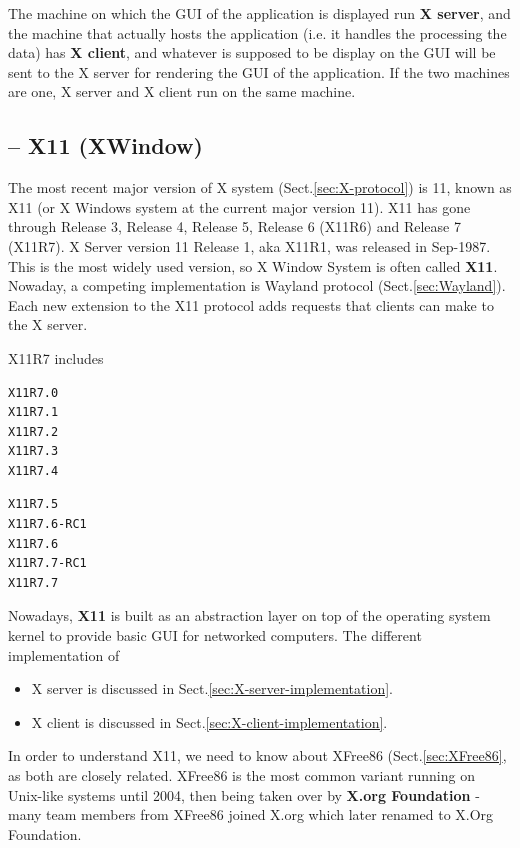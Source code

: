 The machine on which the GUI of the application is displayed run {\bf X server},
and the machine that actually hosts the application (i.e. it handles the
processing the data) has {\bf X client}, and whatever is supposed to be display
on the GUI will be sent to the X server for rendering the GUI of the
application. If the two machines are one, X server and X
client run on the same machine.


\subsection{-- X11 (XWindow)}
\label{sec:X11}

The most recent major version of X system (Sect.\ref{sec:X-protocol}) is 11,
known as X11 (or X Windows system at the current major version 11). X11 has gone
through Release 3, Release 4, Release 5, Release 6 (X11R6) and Release 7
(X11R7). X Server version 11 Release 1, aka X11R1, was released in Sep-1987.
This is the most widely used version, so X Window System is often called {\bf
X11}. Nowaday, a competing implementation is Wayland protocol
(Sect.\ref{sec:Wayland}). Each new extension to the X11 protocol adds requests
that clients can make to the X server. 

X11R7 includes
\begin{minipage}[t]{0.5\textwidth}
\begin{verbatim}
X11R7.0
X11R7.1
X11R7.2
X11R7.3
X11R7.4
\end{verbatim}
\end{minipage}
\begin{minipage}[t]{0.5\textwidth}
\begin{verbatim}
X11R7.5
X11R7.6-RC1
X11R7.6
X11R7.7-RC1
X11R7.7
\end{verbatim}
\end{minipage}

Nowadays, {\bf X11} is built as an abstraction layer on top of the operating
system kernel to provide basic GUI for networked computers. The different implementation of 
\begin{itemize}
  \item X server is discussed in Sect.\ref{sec:X-server-implementation}.
  \item X client is discussed in Sect.\ref{sec:X-client-implementation}.
\end{itemize}

In order to understand X11, we need to know about XFree86
(Sect.\ref{sec:XFree86}, as both are closely related.  XFree86 is the most
common variant running on Unix-like systems until 2004, then being taken over by
{\bf X.org Foundation} -  many team members from XFree86 joined X.org which
later renamed to X.Org Foundation.

